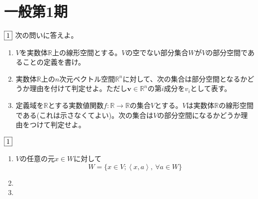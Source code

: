 \documentclass[dvipdfmx]{jsreport}
\newcommand{\R}{\mathbb{R}}
\newcommand{\innerproduct}[2]{\left\langle{#1}, {#2}\right\rangle}
\newcounter{num}[section]
\begin{document}
\section{一般第1期}
\begin{tcolorbox} %
	$\fbox{1}$ 次の問いに答えよ。
\begin{enumerate}
	\item $V$を実数体$\R$上の線形空間とする。$V$の空でない部分集合$W$が$V$の部分空間であることの定義を書け。
	\item 実数体$\R$上の$n$次元ベクトル空間$\R^n$に対して、次の集合は部分空間となるかどうか理由を付けて判定せよ。ただし$\bm{v}\in \R^n$の第$i$成分を$v_i$として表す。

	\item 定義域を$\R$とする実数値関数$f\colon \R\to \R$の集合$V$とする。$V$は実数体$\R$の線形空間である(これは示さなくてよい)。次の集合は$V$の部分空間になるかどうか理由をつけて判定せよ。
\end{enumerate}
\end{tcolorbox}

\begin{answer} %
	$\fbox{1}$
\begin{enumerate}
	\item $V$の任意の元$x\in W$に対して
\begin{equation*}
	W= \{x\in V; \innerproduct{x}{a},\ \forall a\in W\}
\end{equation*}
	\item 
\begin{enumerate_roman}
	\item 
	\item 
\end{enumerate_roman}
	\item 
\begin{enumerate_roman}
	\item 
	\item 
\end{enumerate_roman}
\end{enumerate}
\end{answer}
\end{document}
